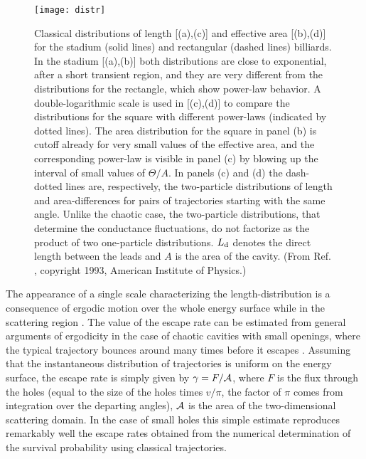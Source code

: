 \documentclass[a4paper,10pt]{article}
\newcommand{\nin}{\noindent}
\begin{document}
\begin{figure}
\setlength{\unitlength}{1mm}
\centerline{\texttt{[image: distr]}}
\caption{Classical distributions of length [(a),(c)] and effective area [(b),(d)] for the stadium (solid lines) and rectangular (dashed lines) billiards. In the stadium [(a),(b)] both distributions are close to exponential, after a short transient region, and they are very different from the distributions for the rectangle, which show power-law behavior. A double-logarithmic scale is used in [(c),(d)] to compare the distributions for the square with different power-laws (indicated by dotted lines). The area distribution for the square in panel (b) is cutoff already for very small values of the effective area, and the corresponding power-law is visible in panel (c) by blowing up the interval of small values of $\Theta/A$. In panels (c) and (d) the dash-dotted lines are, respectively, the two-particle distributions of length and area-differences for pairs of trajectories starting with the same angle. Unlike the chaotic case, the two-particle distributions, that determine the conductance fluctuations, do not factorize as the product of two one-particle distributions. $L_{\rm d}$ denotes the direct length between the leads and $A$ is the area of the cavity. (From Ref. \protect\cite{Chaost}, copyright 1993, American Institute of Physics.)}
\label{fig:distr}
\end{figure}

\nin The appearance of a single scale characterizing the length-distribution is a consequence of ergodic motion over the whole energy surface while in the scattering region \cite{Bau91}. The value of the escape rate can be estimated from general arguments of ergodicity
in the case of chaotic cavities with small openings, where the
typical trajectory bounces around many times before it escapes
\cite{Jen91}. Assuming that the instantaneous distribution of
trajectories is uniform on the energy surface, the escape rate
is simply given by $\gamma=F/{\cal A}$, where $F$ is the flux through
the holes (equal to the size of the holes times $v/\pi$, the factor
of $\pi$ comes from integration over the departing angles), ${\cal A}$
is the area of the two-dimensional scattering domain. In the case
of small holes this simple estimate reproduces remarkably well 
the escape rates obtained from the numerical determination of
the survival probability using classical trajectories.
\end{document}
